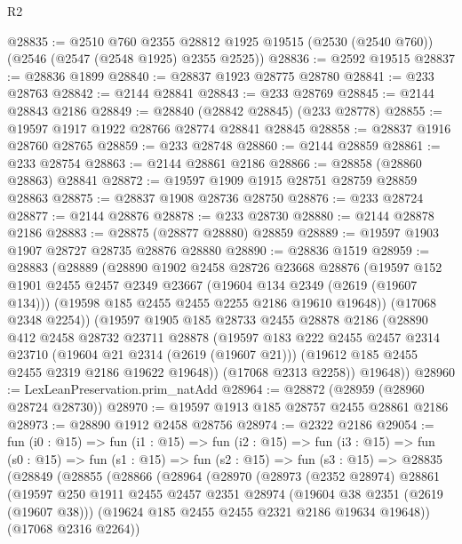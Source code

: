 \begin{lexlean}{R2}
\begin{coremodule}
@28835 := @2510
    @760
    @2355
    @28812
    @1925
    @19515
    (@2530 (@2540 @760))
    (@2546 (@2547 (@2548 @1925) @2355 @2525))
@28836 := @2592 @19515
@28837 := @28836 @1899
@28840 := @28837 @1923 @28775 @28780
@28841 := @233 @28763
@28842 := @2144 @28841
@28843 := @233 @28769
@28845 := @2144 @28843 @2186
@28849 := @28840 (@28842 @28845) (@233 @28778)
@28855 := @19597 @1917 @1922 @28766 @28774 @28841 @28845
@28858 := @28837 @1916 @28760 @28765
@28859 := @233 @28748
@28860 := @2144 @28859
@28861 := @233 @28754
@28863 := @2144 @28861 @2186
@28866 := @28858 (@28860 @28863) @28841
@28872 := @19597 @1909 @1915 @28751 @28759 @28859 @28863
@28875 := @28837 @1908 @28736 @28750
@28876 := @233 @28724
@28877 := @2144 @28876
@28878 := @233 @28730
@28880 := @2144 @28878 @2186
@28883 := @28875 (@28877 @28880) @28859
@28889 := @19597 @1903 @1907 @28727 @28735 @28876 @28880
@28890 := @28836 @1519
@28959 := @28883
    (@28889
      (@28890
        @1902
        @2458
        @28726
        @23668
        @28876
        (@19597
          @152
          @1901
          @2455
          @2457
          @2349
          @23667
          (@19604 @134 @2349 (@2619 (@19607 @134)))
          (@19598 @185 @2455 @2455 @2255 @2186 @19610 @19648))
        (@17068 @2348 @2254))
      (@19597
        @1905
        @185
        @28733
        @2455
        @28878
        @2186
        (@28890
          @412
          @2458
          @28732
          @23711
          @28878
          (@19597
            @183
            @222
            @2455
            @2457
            @2314
            @23710
            (@19604 @21 @2314 (@2619 (@19607 @21)))
            (@19612 @185 @2455 @2455 @2319 @2186 @19622 @19648))
          (@17068 @2313 @2258))
        @19648))
@28960 := LexLeanPreservation.prim_natAdd
@28964 := @28872 (@28959 (@28960 @28724 @28730))
@28970 := @19597 @1913 @185 @28757 @2455 @28861 @2186
@28973 := @28890 @1912 @2458 @28756
@28974 := @2322 @2186
@29054 := fun (i0 : @15) =>
  fun (i1 : @15) =>
  fun (i2 : @15) =>
  fun (i3 : @15) =>
  fun (s0 : @15) =>
  fun (s1 : @15) =>
  fun (s2 : @15) =>
  fun (s3 : @15) =>
  @28835
    (@28849
      (@28855
        (@28866
          (@28964
            (@28970
              (@28973
                (@2352 @28974)
                @28861
                (@19597
                  @250
                  @1911
                  @2455
                  @2457
                  @2351
                  @28974
                  (@19604 @38 @2351 (@2619 (@19607 @38)))
                  (@19624 @185 @2455 @2455 @2321 @2186 @19634 @19648))
                (@17068 @2316 @2264))

\end{coremodule}
\end{lexlean}
